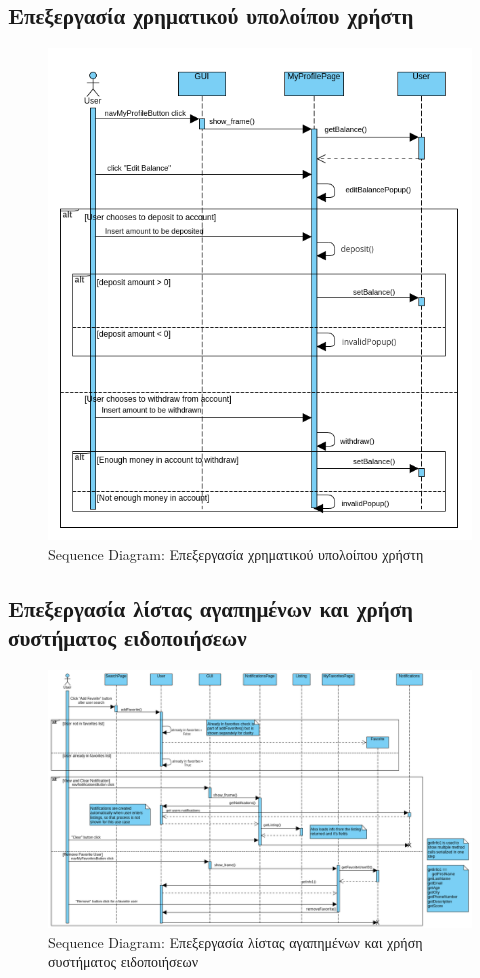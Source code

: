 \documentclass[12pt,a4paper]{article}
\begin{document}
\subsection{Επεξεργασία χρηματικού υπολοίπου χρήστη}
\begin{figure}[H]
	\includegraphics[width=\textwidth]{Edit User Balance Sequence.png}
	\caption{Sequence Diagram: Επεξεργασία χρηματικού υπολοίπου χρήστη}
	\label{Sequence Diagram: Επεξεργασία χρηματικού υπολοίπου χρήστη}
\end{figure}

\subsection{Επεξεργασία λίστας αγαπημένων και χρήση συστήματος ειδοποιήσεων}
\begin{figure}[H]
	\includegraphics[width=\textwidth]{Favorite Users and Notification System Sequence.png}
	\caption{Sequence Diagram: Επεξεργασία λίστας αγαπημένων και χρήση συστήματος ειδοποιήσεων}
	\label{Sequence Diagram: Επεξεργασία λίστας αγαπημένων και χρήση συστήματος ειδοποιήσεων}
\end{figure}
\end{document}
